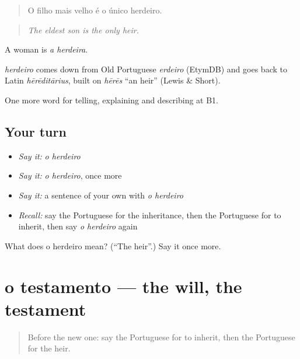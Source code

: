 \begin{quote}
O filho mais velho é o único herdeiro.
\end{quote}

\begin{quote}
\emph{The eldest son is the only heir.}
\end{quote}

A woman is \emph{a herdeira}.

\begin{cousinweb}
\emph{herdeiro} comes down from Old Portuguese \emph{erdeiro} (EtymDB) and goes back to Latin \emph{hērēditārius}, built on \emph{hērēs} \textquotedblleft{}an heir\textquotedblright{} (Lewis \& Short).
\end{cousinweb}

\begin{grammarlens}[title={What you've built}]
One more word for telling, explaining and describing at B1.
\end{grammarlens}

\subsection*{Your turn}
\begin{itemize}
\raggedright
  \item \emph{Say it:} \emph{o herdeiro}
  \item \emph{Say it:} \emph{o herdeiro}, once more
  \item \emph{Say it:} a sentence of your own with \emph{o herdeiro}
  \item \emph{Recall:} say the Portuguese for the inheritance, then the Portuguese for to inherit, then say \emph{o herdeiro} again
\end{itemize}

\begin{tcolorbox}[breakable,colback=teal!4,colframe=teal!35!black,title={Before you move on}]
What does o herdeiro mean? (\textquotedblleft{}The heir\textquotedblright{}.) Say it once more.
\end{tcolorbox}
\section[o testamento]{o testamento — the will, the testament}

\label{lesson:PT-C316-testamento}



\begin{quote}
Before the new one: say the Portuguese for to inherit, then the Portuguese for the heir.
\end{quote}

